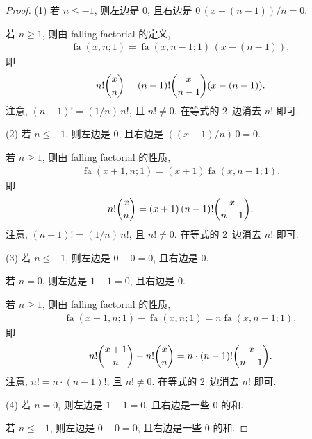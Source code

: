 \documentclass[../libro.tex]{subfiles}
\begin{document}
\begin{proof}
    (1)
    若 \(n \leq -1\), 则左边是 \(0\),
    且右边是 \(0\, (x - (n - 1))/n = 0\).

    若 \(n \geq 1\), 则由 falling factorial 的定义,
    \begin{align*}
        \operatorname{fa} {(x, n; 1)}
        = \operatorname{fa} {(x, n-1; 1)}\, (x - (n - 1)),
    \end{align*}
    即
    \begin{align*}
        n! \dbinom{x}{n}
        = (n-1)! \dbinom{x}{n-1} (x - (n - 1)).
    \end{align*}
    注意, \((n-1)! = (1/n)\, n!\), 且 \(n! \neq 0\).
    在等式的 \(2\)~边消去 \(n!\) 即可.

    (2)
    若 \(n \leq -1\), 则左边是 \(0\),
    且右边是 \(((x + 1)/n)\, 0 = 0\).

    若 \(n \geq 1\), 则由 falling factorial 的性质,
    \begin{align*}
        \operatorname{fa} {(x+1, n; 1)}
        = (x+1) \operatorname{fa} {(x, n-1; 1)}.
    \end{align*}
    即
    \begin{align*}
        n! \dbinom{x}{n}
        = (x+1)\, (n-1)! \dbinom{x}{n-1}.
    \end{align*}
    注意, \((n-1)! = (1/n)\, n!\), 且 \(n! \neq 0\).
    在等式的 \(2\)~边消去 \(n!\) 即可.

    (3)
    若 \(n \leq -1\), 则左边是 \(0 - 0 = 0\),
    且右边是 \(0\).

    若 \(n = 0\), 则左边是 \(1 - 1 = 0\),
    且右边是 \(0\).

    若 \(n \geq 1\), 则由 falling factorial 的性质,
    \begin{align*}
        \operatorname{fa} {(x + 1, n; 1)}
        - \operatorname{fa} {(x, n; 1)}
        = n \operatorname{fa} {(x, n-1; 1)},
    \end{align*}
    即
    \begin{align*}
        n! \dbinom{x+1}{n} - n! \dbinom{x}{n}
        = n \cdot (n-1)! \dbinom{x}{n-1}.
    \end{align*}
    注意, \(n! = n \cdot (n-1)!\), 且 \(n! \neq 0\).
    在等式的 \(2\)~边消去 \(n!\) 即可.

    (4)
    若 \(n = 0\), 则左边是 \(1 - 1 = 0\),
    且右边是一些 \(0\) 的和.

    若 \(n \leq -1\), 则左边是 \(0 - 0 = 0\),
    且右边是一些 \(0\) 的和.


\end{proof}
\end{document}
